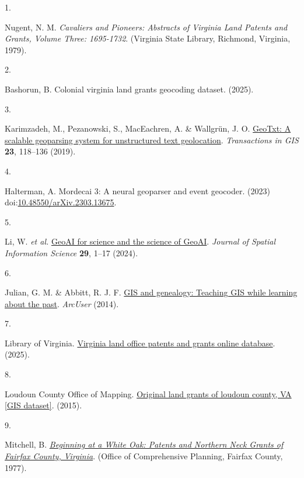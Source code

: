 \documentclass[
  10pt]{article}
\newlength{\cslhangindent}
\newlength{\csllabelwidth}
\newenvironment{CSLReferences}[2] %
 {\begin{list}{}{%
  \setlength{\itemindent}{0pt}
  \setlength{\leftmargin}{0pt}
  \setlength{\parsep}{0pt}
  \ifodd #1
   \setlength{\leftmargin}{\cslhangindent}
   \setlength{\itemindent}{-1\cslhangindent}
  \fi
  \setlength{\itemsep}{#2\baselineskip}}}
 {\end{list}}
\newcommand{\CSLLeftMargin}[1]{\parbox[t]{\csllabelwidth}{\strut#1\strut}}
\newcommand{\CSLRightInline}[1]{\parbox[t]{\linewidth - \csllabelwidth}{\strut#1\strut}}
\begin{document}
\protect{}\label{refs}
\begin{CSLReferences}{0}{0}
\CSLLeftMargin{1. }%
\CSLRightInline{Nugent, N. M. \emph{Cavaliers and Pioneers: Abstracts of
Virginia Land Patents and Grants, Volume Three: 1695-1732}. (Virginia
State Library, Richmond, Virginia, 1979).}

\CSLLeftMargin{2. }%
\CSLRightInline{Bashorun, B. Colonial virginia land grants geocoding
dataset. (2025).}

\CSLLeftMargin{3. }%
\CSLRightInline{Karimzadeh, M., Pezanowski, S., MacEachren, A. \&
Wallgrün, J. O. \href{https://doi.org/10.1111/tgis.12510}{GeoTxt: A
scalable geoparsing system for unstructured text geolocation}.
\emph{Transactions in GIS} \textbf{23}, 118--136 (2019).}

\CSLLeftMargin{4. }%
\CSLRightInline{Halterman, A. Mordecai 3: A neural geoparser and event
geocoder. (2023)
doi:\href{https://doi.org/10.48550/arXiv.2303.13675}{10.48550/arXiv.2303.13675}.}

\CSLLeftMargin{5. }%
\CSLRightInline{Li, W. \emph{et al.}
\href{https://doi.org/10.5311/JOSIS.2024.29.349}{GeoAI for science and
the science of GeoAI}. \emph{Journal of Spatial Information Science}
\textbf{29}, 1--17 (2024).}

\CSLLeftMargin{6. }%
\CSLRightInline{Julian, G. M. \& Abbitt, R. J. F.
\href{https://www.esri.com/about/newsroom/arcuser/gis-and-genealogy}{GIS
and genealogy: Teaching GIS while learning about the past}.
\emph{ArcUser} (2014).}

\CSLLeftMargin{7. }%
\CSLRightInline{Library of Virginia.
\href{https://lva-virginia.libguides.com/land-grants}{Virginia land
office patents and grants online database}. (2025).}

\CSLLeftMargin{8. }%
\CSLRightInline{Loudoun County Office of Mapping.
\href{https://www.arcgis.com/apps/MapTools/index.html?appid=d3c4ba1031564f919ca28c9bb5a48350}{Original
land grants of loudoun county, VA {[}GIS dataset{]}}. (2015).}

\CSLLeftMargin{9. }%
\CSLRightInline{Mitchell, B.
\emph{\href{https://www.fairfaxcounty.gov/history-commission/sites/history-commission/files/assets/documents/resources/map.pdf}{Beginning
at a White Oak: Patents and Northern Neck Grants of Fairfax County,
Virginia}}. (Office of Comprehensive Planning, Fairfax County, 1977).}


\end{CSLReferences}
\end{document}
